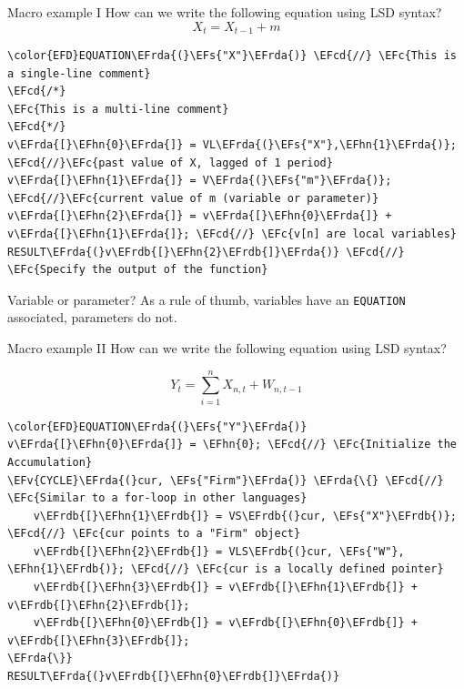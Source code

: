 \documentclass[bigger,aspectratio=169]{beamer}
\newcommand{\EFc}[1]{\textcolor{EFc}{#1}} %
\newcommand{\EFcd}[1]{\textcolor{EFcd}{#1}} %
\newcommand{\EFs}[1]{\textcolor{EFs}{#1}} %
\newcommand{\EFv}[1]{\textcolor{EFv}{#1}} %
\newcommand{\EFhn}[1]{\textcolor{EFhn}{\textbf{#1}}} %
\newcommand{\EFrda}[1]{\textcolor{EFrda}{#1}} %
\newcommand{\EFrdb}[1]{\textcolor{EFrdb}{#1}} %
\begin{document}
\begin{frame}[label={sec:org3be7e12},fragile]{Macro example I}
 How can we write the following equation using LSD syntax?
\[X_{t} = X_{t-1} + m\]
\begin{Code}
\begin{Verbatim}
\color{EFD}EQUATION\EFrda{(}\EFs{"X"}\EFrda{)} \EFcd{//} \EFc{This is a single-line comment}
\EFcd{/*}
\EFc{This is a multi-line comment}
\EFcd{*/}
v\EFrda{[}\EFhn{0}\EFrda{]} = VL\EFrda{(}\EFs{"X"},\EFhn{1}\EFrda{)}; \EFcd{//}\EFc{past value of X, lagged of 1 period}
v\EFrda{[}\EFhn{1}\EFrda{]} = V\EFrda{(}\EFs{"m"}\EFrda{)}; \EFcd{//}\EFc{current value of m (variable or parameter)}
v\EFrda{[}\EFhn{2}\EFrda{]} = v\EFrda{[}\EFhn{0}\EFrda{]} + v\EFrda{[}\EFhn{1}\EFrda{]}; \EFcd{//} \EFc{v[n] are local variables}
RESULT\EFrda{(}v\EFrdb{[}\EFhn{2}\EFrdb{]}\EFrda{)} \EFcd{//} \EFc{Specify the output of the function}
\end{Verbatim}
\end{Code}
\begin{block}{Variable or parameter?}
As a rule of thumb, variables have an \texttt{EQUATION} associated, parameters do not.
\end{block}
\end{frame}
\begin{frame}[label={sec:org01384f5},fragile]{Macro example II}
 How can we write the following equation using LSD syntax?

\[Y_{t} = \sum_{i=1}^{n} X_{n,t} + W_{n,t-1}\]



\begin{Code}
\begin{Verbatim}
\color{EFD}EQUATION\EFrda{(}\EFs{"Y"}\EFrda{)}
v\EFrda{[}\EFhn{0}\EFrda{]} = \EFhn{0}; \EFcd{//} \EFc{Initialize the Accumulation}
\EFv{CYCLE}\EFrda{(}cur, \EFs{"Firm"}\EFrda{)} \EFrda{\{} \EFcd{//} \EFc{Similar to a for-loop in other languages}
    v\EFrdb{[}\EFhn{1}\EFrdb{]} = VS\EFrdb{(}cur, \EFs{"X"}\EFrdb{)}; \EFcd{//} \EFc{cur points to a "Firm" object}
    v\EFrdb{[}\EFhn{2}\EFrdb{]} = VLS\EFrdb{(}cur, \EFs{"W"}, \EFhn{1}\EFrdb{)}; \EFcd{//} \EFc{cur is a locally defined pointer}
    v\EFrdb{[}\EFhn{3}\EFrdb{]} = v\EFrdb{[}\EFhn{1}\EFrdb{]} + v\EFrdb{[}\EFhn{2}\EFrdb{]};
    v\EFrdb{[}\EFhn{0}\EFrdb{]} = v\EFrdb{[}\EFhn{0}\EFrdb{]} + v\EFrdb{[}\EFhn{3}\EFrdb{]};
\EFrda{\}}
RESULT\EFrda{(}v\EFrdb{[}\EFhn{0}\EFrdb{]}\EFrda{)}
\end{Verbatim}
\end{Code}
\end{frame}
\end{document}
